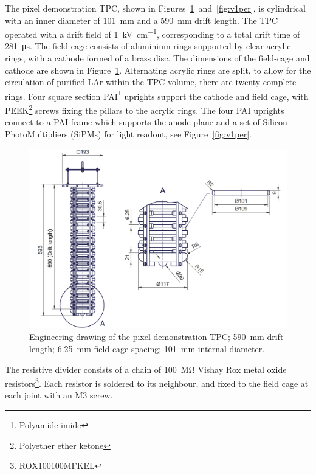 \documentclass[instruments,article,submit,moreauthors,pdftex]{Definitions/mdpi}
\begin{document}
The pixel demonstration TPC, shown in Figures~\ref{fig:schematic}~and~\ref{fig:v1per}, is cylindrical with an inner diameter of \SI{101}{\milli\metre} and a \SI{590}{\milli\metre} drift length. 
The TPC operated with a drift field of \SI{1}{\kilo\volt\per\centi\metre}, corresponding to a total drift time of \SI{281}{\micro\second}. 
The field-cage consists of aluminium rings supported by clear acrylic rings, with a cathode formed of a brass disc. 
The dimensions of the field-cage and cathode are shown in Figure~\ref{fig:schematic}.
Alternating acrylic rings are split, to allow for the circulation of purified LAr within the TPC volume, there are twenty complete rings.
Four square section PAI\footnote{Polyamide-imide} uprights support the cathode and field cage, with PEEK\footnote{Polyether ether ketone} screws fixing the pillars to the acrylic rings.
The four PAI uprights connect to a PAI frame which supports the anode plane and a set of  Silicon PhotoMultipliers (SiPMs) for light readout, see Figure~\ref{fig:v1per}. 

\begin{figure}[!ht]
	\centering
	\includegraphics[width=0.9\linewidth]{Figures/Schematic.png}
	\caption{\small Engineering drawing of the pixel demonstration TPC; \SI{590}{\milli\metre} drift length; \SI{6.25}{\milli\metre} field cage spacing; \SI{101}{\milli\metre} internal diameter.}
	\label{fig:schematic}
\end{figure}

The resistive divider consists of a chain of \SI{100}{\mega\ohm} Vishay Rox metal oxide resistors\footnote{ROX100100MFKEL}. Each resistor is soldered to its neighbour, and fixed to the field cage at each joint with an M3 screw.   
\end{document}
